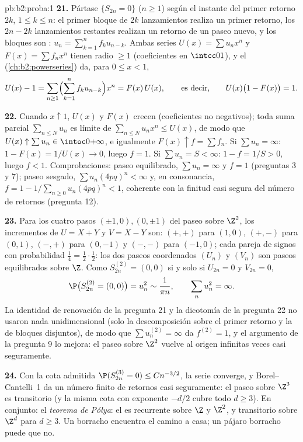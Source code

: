 \begin{solution}{pb:b2:proba:1}
\textbf{21.} Pártase $\{S_{2n} = 0\}$ ($n \geq 1$) según el instante
del primer retorno $2k$, $1 \leq k \leq n$: el primer bloque de $2k$
lanzamientos realiza un primer retorno, los $2n - 2k$ lanzamientos
restantes realizan un retorno de un paseo nuevo, y los bloques son
: $u_n = \sum_{k=1}^nf_ku_{n-k}$. Ambas series $U(x)
= \sum u_nx^n$ y $F(x) = \sum f_nx^n$ tienen radio $\geq 1$
(coeficientes en $\intcc01$), y el 
(\cref{ch:b2:powerseries}) da, para $0 \leq x < 1$,
\[
U(x) - 1 = \sum_{n\geq1}\Bigl(\sum_{k=1}^n
f_ku_{n-k}\Bigr)x^n = F(x)\,U(x),
\qquad\text{es decir,}\qquad
U(x)\bigl(1 - F(x)\bigr) = 1 .
\]

\textbf{22.} Cuando $x \uparrow 1$, $U(x)$ y $F(x)$ crecen
(coeficientes no negativos); toda suma parcial $\sum_{n\leq N}u_n$ es
límite de $\sum_{n\leq N}u_nx^n \leq U(x)$, de modo que $U(x)
\uparrow \sum u_n \in \intoc0{+\infty}$, e igualmente $F(x) \uparrow
f = \sum f_n$. Si $\sum u_n = \infty$: $1 - F(x) = 1/U(x) \to 0$,
luego $f = 1$. Si $\sum u_n = S < \infty$: $1 - f = 1/S > 0$, luego
$f < 1$. Comprobaciones: paseo equilibrado, $\sum u_n = \infty$ y $f
= 1$ (preguntas 3 y 7); paseo sesgado, $\sum u_n(4pq)^n < \infty$ y,
en consonancia, $f = 1 - 1/\sum_{n\geq0}u_n(4pq)^n < 1$, coherente
con la finitud casi segura del número de retornos (pregunta 12).

\textbf{23.} Para los cuatro pasos $(\pm1, 0), (0, \pm1)$ del paseo
sobre $\Z^2$, los incrementos de $U = X + Y$ y $V = X - Y$ son:
$(+,+)$ para $(1,0)$, $(+,-)$ para $(0,1)$, $(-,+)$ para $(0,-1)$ y
$(-,-)$ para $(-1,0)$; cada pareja de signos con probabilidad
$\frac14 = \frac12\cdot\frac12$: los dos paseos coordenados $(U_n)$ y
$(V_n)$ son paseos equilibrados  sobre $\Z$. Como
$S^{(2)}_{2n} = (0,0)$ si y solo si $U_{2n} = 0$ y $V_{2n} = 0$,
\[
\P\bigl(S^{(2)}_{2n} = (0,0)\bigr) = u_n^2 \sim \frac1{\pi
n}, \qquad \sum_nu_n^2 = \infty .
\]
La identidad de renovación de la pregunta 21 y la dicotomía de la
pregunta 22 no usaron nada unidimensional (solo la descomposición
sobre el primer retorno y la  de bloques disjuntos), de
modo que $\sum u_n^{(2)} = \infty$ da $f^{(2)} = 1$, y el argumento
de la pregunta 9 lo mejora: el paseo sobre $\Z^2$ vuelve al origen
infinitas veces casi seguramente.

\textbf{24.} Con la cota admitida $\P(S^{(3)}_{2n} = 0) \leq
Cn^{-3/2}$, la serie converge, y Borel--Cantelli~1 da un número
finito de retornos casi seguramente: el paseo sobre $\Z^3$ es
transitorio (y la misma cota con exponente $-d/2$ cubre todo $d \geq
3$). En conjunto: el \emph{teorema de Pólya}: el
 es recurrente sobre $\Z$ y $\Z^2$, y
transitorio sobre $\Z^d$ para $d \geq 3$. Un borracho encuentra el
camino a casa; un pájaro borracho puede que no.


\end{solution}
